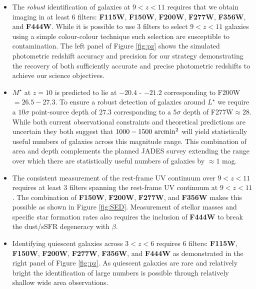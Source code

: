 \documentclass[12pt]{article}
\begin{document}
\begin{itemize}

\item The \emph{robust} identification of galaxies at $9<z<11$ requires that we obtain imaging in at least 6 filters: {\bf F115W}, {\bf F150W}, {\bf F200W}, {\bf F277W}, {\bf F356W}, and {\bf F444W}. While it is possible to use 3 filters to select $9<z<11$ galaxies using a simple colour-colour technique such selection are susceptible to contamination. The left panel of Figure \ref{fig:pz} shows the simulated photometric redshift accuracy and precision for our strategy demonstrating the recovery of both sufficiently accurate and precise photometric redshifts to achieve our science objectives.

\item $M^{\star}$ at $z=10$ is predicted to lie at $-20.4$ - $-21.2$ corresponding to F200W$=26.5-27.3$. To ensure a robust detection of galaxies around $L^{\star}$ we require a $10\sigma$ point-source depth of $27.3$ corresponding to a $5\sigma$ depth of F277W$\approx 28$. While both current observational constraints and theoretical predictions are uncertain they both suggest that $1000-1500\ {\rm arcmin^2}$ will yield statistically useful numbers of galaxies across this magnitude range. This combination of area and depth complements the planned JADES survey extending the range over which there are statistically useful numbers of galaxies by $\approx 1$ mag.

\item The consistent measurement of the rest-frame UV continuum over $9<z<11$ requires at least 3 filters spanning the rest-frame UV continuum at $9<z<11$. The combination of {\bf F150W}, {\bf F200W}, {\bf F277W}, and {\bf F356W} makes this possible as shown in Figure \ref{fig:SED}. Measurement of stellar masses and specific star formation rates also requires the inclusion of {\bf F444W} to break the dust/sSFR degeneracy with $\beta$.

\item Identifying quiescent galaxies across $3<z<6$ requires 6 filters: {\bf F115W}, {\bf F150W}, {\bf F200W}, {\bf F277W}, {\bf F356W}, and {\bf F444W} as demonstrated in the right panel of Figure \ref{fig:pz}. As quiescent galaxies are rare and relatively bright the identification of large numbers is possible through relatively shallow wide area observations. 

\end{itemize}
\end{document}
